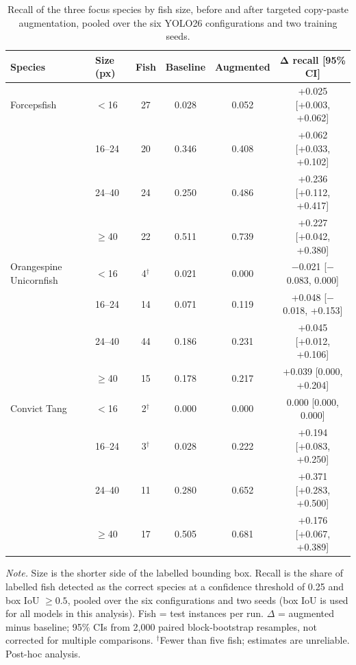 \begin{table}[htbp]
    \centering
    \caption[Focus-species recall by fish size, before and after copy-paste augmentation]{Recall of the three focus species by fish size, before and after targeted copy-paste augmentation, pooled over the six YOLO26 configurations and two training seeds.}
    \label{tab:recall_size}
    \small
    \setlength{\tabcolsep}{6pt}
    \renewcommand{\arraystretch}{1.15}
    \begin{tabular}{llcccc}
        \toprule
        \textbf{Species} & \textbf{Size (px)} & \textbf{Fish} & \textbf{Baseline} & \textbf{Augmented} & $\boldsymbol{\Delta}$\textbf{ recall [95\% CI]} \\
        \midrule
        Forcepsfish & $<$16 & 27 & 0.028 & 0.052 & +0.025 [+0.003, +0.062] \\
         & 16--24 & 20 & 0.346 & 0.408 & +0.062 [+0.033, +0.102] \\
         & 24--40 & 24 & 0.250 & 0.486 & +0.236 [+0.112, +0.417] \\
         & $\geq$40 & 22 & 0.511 & 0.739 & +0.227 [+0.042, +0.380] \\
        \midrule
        Orangespine Unicornfish & $<$16 & 4$^{\dagger}$ & 0.021 & 0.000 & $-$0.021 [$-$0.083, 0.000] \\
         & 16--24 & 14 & 0.071 & 0.119 & +0.048 [$-$0.018, +0.153] \\
         & 24--40 & 44 & 0.186 & 0.231 & +0.045 [+0.012, +0.106] \\
         & $\geq$40 & 15 & 0.178 & 0.217 & +0.039 [0.000, +0.204] \\
        \midrule
        Convict Tang & $<$16 & 2$^{\dagger}$ & 0.000 & 0.000 & 0.000 [0.000, 0.000] \\
         & 16--24 & 3$^{\dagger}$ & 0.028 & 0.222 & +0.194 [+0.083, +0.250] \\
         & 24--40 & 11 & 0.280 & 0.652 & +0.371 [+0.283, +0.500] \\
         & $\geq$40 & 17 & 0.505 & 0.681 & +0.176 [+0.067, +0.389] \\
        \bottomrule
    \end{tabular}

    \vspace{3pt}
    \begin{minipage}{\linewidth}
    \footnotesize\textit{Note.} Size is the shorter side of the labelled bounding box. Recall is the share of labelled fish
    detected as the correct species at a confidence threshold of 0.25 and box IoU $\geq 0.5$, pooled over the six
    configurations and two seeds (box IoU is used for all models in this analysis). Fish = test instances per run.
    $\Delta$ = augmented minus baseline; 95\% CIs from 2,000 paired block-bootstrap resamples, not corrected for multiple
    comparisons. $^{\dagger}$Fewer than five fish; estimates are unreliable. Post-hoc analysis.
    \end{minipage}
\end{table}

